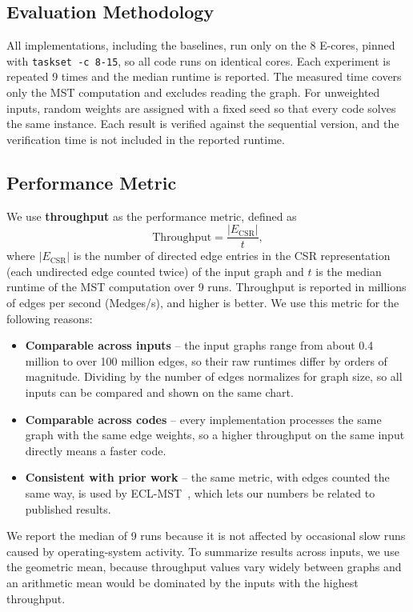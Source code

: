 \documentclass[11pt,a4paper]{article}
\begin{document}
\subsection*{Evaluation Methodology}
All implementations, including the baselines, run only on the 8 E-cores, pinned with \texttt{taskset -c 8-15}, so all code runs on identical cores. Each experiment is repeated 9 times and the median runtime is reported. The measured time covers only the MST computation and excludes reading the graph. For unweighted inputs, random weights are assigned with a fixed seed so that every code solves the same instance. Each result is verified against the sequential version, and the verification time is not included in the reported runtime.

\subsection*{Performance Metric}
We use \textbf{throughput} as the performance metric, defined as
\[
  \text{Throughput} = \frac{|E_{\text{CSR}}|}{t},
\]
where $|E_{\text{CSR}}|$ is the number of directed edge entries in the CSR representation (each undirected edge counted twice) of the input graph and $t$ is the median runtime of the MST computation over 9 runs. Throughput is reported in millions of edges per second (Medges/s), and higher is better. We use this metric for the following reasons:
\begin{itemize}
  \item \textbf{Comparable across inputs} -- the input graphs range from about 0.4 million to over 100 million edges, so their raw runtimes differ by orders of magnitude. Dividing by the number of edges normalizes for graph size, so all inputs can be compared and shown on the same chart.
  \item \textbf{Comparable across codes} -- every implementation processes the same graph with the same edge weights, so a higher throughput on the same input directly means a faster code.
  \item \textbf{Consistent with prior work} -- the same metric, with edges counted the same way, is used by ECL-MST~\cite{fallin2023eclmst}, which lets our numbers be related to published results.
\end{itemize}

We report the median of 9 runs because it is not affected by occasional slow runs caused by operating-system activity. To summarize results across inputs, we use the geometric mean, because throughput values vary widely between graphs and an arithmetic mean would be dominated by the inputs with the highest throughput.
\end{document}
